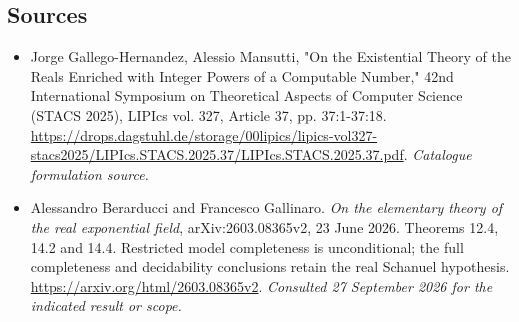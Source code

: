 \documentclass[11pt,a4paper]{article}
\numberwithin{equation}{section}
\begin{document}
\subsection{Sources}
\begin{itemize}\raggedright
\item[\textnormal{[S1]}]\hypertarget{source:statement:1}{} Jorge Gallego-Hernandez, Alessio Mansutti, "On the Existential Theory of the Reals Enriched with Integer Powers of a Computable Number," 42nd International Symposium on Theoretical Aspects of Computer Science (STACS 2025), LIPIcs vol. 327, Article 37, pp. 37:1-37:18.
\url{https://drops.dagstuhl.de/storage/00lipics/lipics-vol327-stacs2025/LIPIcs.STACS.2025.37/LIPIcs.STACS.2025.37.pdf}.
{\small\textit{Catalogue formulation source.}}
\item[\textnormal{[E1]}]\hypertarget{extra:statement:1}{} Alessandro Berarducci and Francesco Gallinaro.
\emph{On the elementary theory of the real exponential field}, arXiv:2603.08365v2, 23 June 2026. Theorems 12.4, 14.2 and 14.4. Restricted model completeness is unconditional; the full completeness and decidability conclusions retain the real Schanuel hypothesis.
\url{https://arxiv.org/html/2603.08365v2}.
{\small\textit{Consulted 27 September 2026 for the indicated result or scope.}}
\end{itemize}
\end{document}
